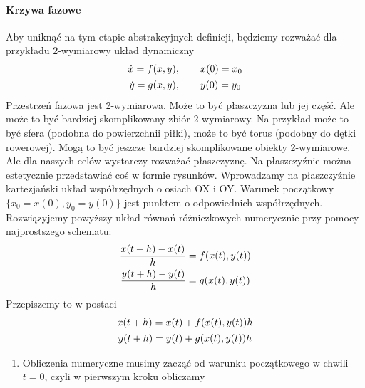 \documentclass[a4paper,12pt,polish]{sphinxmanual}
\begin{document}
\paragraph{Krzywa fazowe}
\label{ch1/chI021:krzywa-fazowe}
Aby uniknąć na tym etapie abstrakcyjnych definicji, będziemy rozważać dla przykładu 2-wymiarowy układ dynamiczny
\label{ch1/chI021:equation-eqn33}\begin{gather}
\begin{split} \dot x = f(x, y), \quad \quad x(0) = x_0\end{split}\label{ch1/chI021-eqn33}\\\begin{split} \dot y= g(x, y),\quad \quad y(0) = y_0\end{split}\notag
\end{gather}
Przestrzeń fazowa jest 2-wymiarowa. Może to być płaszczyzna lub jej część. Ale może to być bardziej skomplikowany zbiór 2-wymiarowy. Na przykład może to być sfera (podobna do  powierzchnii piłki), może to być torus (podobny do dętki rowerowej). Mogą to być jeszcze bardziej skomplikowane obiekty 2-wymiarowe. Ale dla naszych celów wystarczy rozważać płaszczyznę. Na płaszczyźnie można estetycznie przedstawiać coś w formie rysunków. Wprowadzamy na płaszczyźnie kartezjański układ współrzędnych o osiach OX i OY. Warunek początkowy $\{x_0=x(0), y_0=y(0)\}$ jest punktem o odpowiednich współrzędnych. Rozwiązyjemy powyższy układ równań różniczkowych numerycznie przy pomocy najprostszego schematu:
\label{ch1/chI021:equation-eqn35}\begin{gather}
\begin{split}\frac{x(t+h) - x(t)}{h} = f(x(t), y(t))\end{split}\label{ch1/chI021-eqn35}\\\begin{split}\frac{y(t+h) - y(t)}{h} = g(x(t), y(t))\end{split}\notag
\end{gather}
Przepiszemy to w postaci
\label{ch1/chI021:equation-eqn37}\begin{gather}
\begin{split}x(t+h) = x(t) + f(x(t), y(t)) h\end{split}\label{ch1/chI021-eqn37}\\\begin{split}y(t+h) = y(t) + g(x(t), y(t)) h\end{split}\notag
\end{gather}\begin{enumerate}
\item {} 
Obliczenia numeryczne musimy zacząć od warunku początkowego w chwili $t=0$, czyli w pierwszym kroku obliczamy

\end{enumerate}
\end{document}
